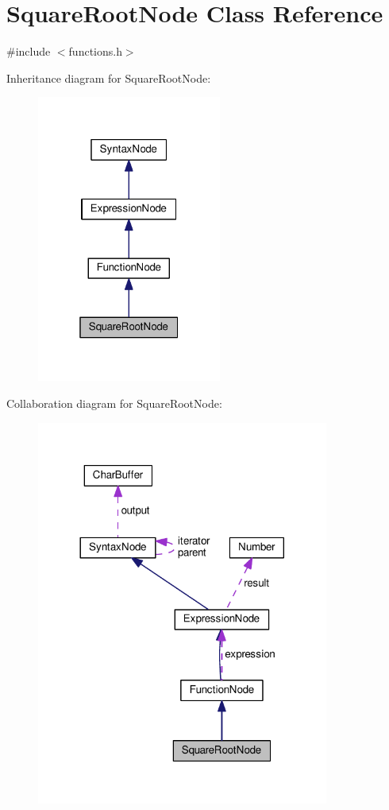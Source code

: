 \hypertarget{classSquareRootNode}{}\section{Square\+Root\+Node Class Reference}
\label{classSquareRootNode}


{\ttfamily \#include $<$functions.\+h$>$}



Inheritance diagram for Square\+Root\+Node\+:\nopagebreak
\begin{figure}[H]
\begin{center}
\leavevmode
\includegraphics[width=172pt]{classSquareRootNode__inherit__graph}
\end{center}
\end{figure}


Collaboration diagram for Square\+Root\+Node\+:\nopagebreak
\begin{figure}[H]
\begin{center}
\leavevmode
\includegraphics[width=272pt]{classSquareRootNode__coll__graph}
\end{center}
\end{figure}
